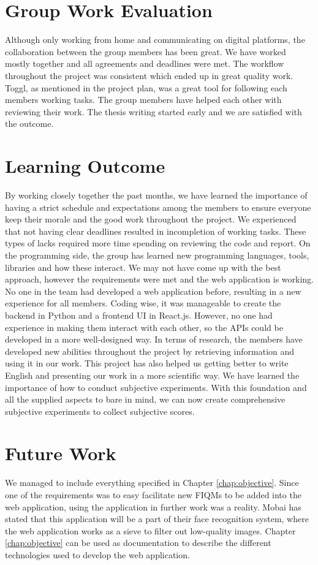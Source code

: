 \section{Group Work Evaluation}
\label{sec:groupworkevaluation}
Although only working from home and communicating on digital platforms, the collaboration between the group members has been great. We have worked mostly together and all agreements and deadlines were met. The workflow throughout the project was consistent which ended up in great quality work. Toggl, as mentioned in the project plan, was a great tool for following each members working tasks. The group members have helped each other with reviewing their work. The thesis writing started early and we are satisfied with the outcome. 

\section{Learning Outcome}
\label{sec:learningoutcome}
By working closely together the past months, we have learned the importance of having a strict schedule and expectations among the members to ensure everyone keep their morale and the good work throughout the project. We experienced that not having clear deadlines resulted in incompletion of working tasks. These types of lacks required more time spending on reviewing the code and report. On the programming side, the group has learned new programming languages, tools, libraries and how these interact. We may not have come up with the best approach, however the requirements were met and the web application is working. No one in the team had developed a web application before, resulting in a new experience for all members. Coding wise, it was manageable to create the backend in Python and a frontend UI in React.js. However, no one had experience in making them interact with each other, so the APIs could be developed in a more well-designed way. In terms of research, the members have developed new abilities throughout the project by retrieving information and using it in our work. This project has also helped us getting better to write English and presenting our work in a more scientific way. We have learned the importance of how to conduct subjective experiments. With this foundation and all the supplied aspects to bare in mind, we can now create comprehensive subjective experiments to collect subjective scores. 

\section{Future Work}
\label{sec:futurework}
We managed to include everything specified in Chapter \ref{chap:objective}. Since one of the requirements was to easy facilitate new FIQMs to be added into the web application, using the application in further work was a reality. Mobai has stated that this application will be a part of their face recognition system, where the web application works as a sieve to filter out low-quality images. Chapter \ref{chap:objective} can be used as documentation to describe the different technologies used to develop the web application.

